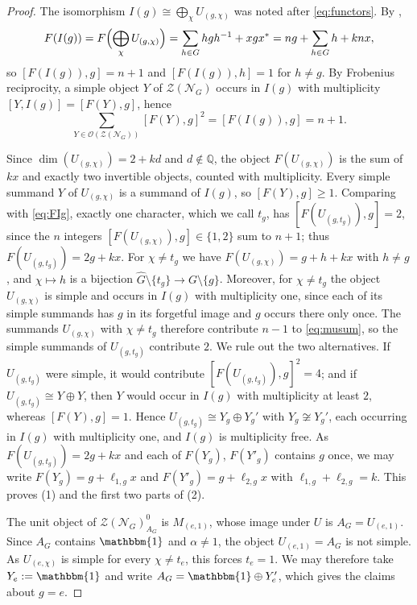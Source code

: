 \documentclass[10pt]{article}
\theoremstyle{plain}
\theoremstyle{definition}
\theoremstyle{plain}
\begin{document}
\begin{proof}
The isomorphism $I(g)\cong\bigoplus_\chi U_{(g,\chi)}$ was noted after \eqref{eq:functors}. By \cite[Proposition 5.4]{MR2183279},
\begin{equation}\label{eq:FIg}
F(I(g)) = F\Bigl(\bigoplus_\chi U_{(g,\chi)}\Bigr)=\sum_{h\in G}hgh^{-1}+xgx^\ast=ng+\sum_{h\in G}h+knx,
\end{equation}
so $[F(I(g)),g]=n+1$ and $[F(I(g)),h]=1$ for $h\neq g$. By Frobenius reciprocity, a simple object $Y$ of $\mathcal{Z}(\mathcal{N}_G)$ occurs in $I(g)$ with multiplicity $[Y,I(g)]=[F(Y),g]$, hence
\begin{equation}\label{eq:musum}
\sum_{Y \in \mathcal{O}(\mathcal{Z}(\mathcal{N}_G))}[F(Y),g]^2=[F(I(g)),g]=n+1.
\end{equation}

\par Since $\dim(U_{(g,\chi)})=2+kd$ and $d\notin\mathbb{Q}$, the object $F(U_{(g,\chi)})$ is the sum of $kx$ and exactly two invertible objects, counted with multiplicity. Every simple summand $Y$ of $U_{(g,\chi)}$ is a summand of $I(g)$, so $[F(Y),g]\geq1$. Comparing with \eqref{eq:FIg}, exactly one character, which we call $t_g$, has $[F(U_{(g,t_g)}),g]=2$, since the $n$ integers $[F(U_{(g,\chi)}),g]\in\{1,2\}$ sum to $n+1$; thus $F(U_{(g,t_g)})=2g+kx$. For $\chi\neq t_g$ we have $F(U_{(g,\chi)})=g+h+kx$ with $h\neq g$, and $\chi\mapsto h$ is a bijection $\widehat{G}\setminus\{t_g\}\to G\setminus\{g\}$. Moreover, for $\chi\neq t_g$ the object $U_{(g,\chi)}$ is simple and occurs in $I(g)$ with multiplicity one, since each of its simple summands has $g$ in its forgetful image and $g$ occurs there only once. The summands $U_{(g,\chi)}$ with $\chi\neq t_g$ therefore contribute $n-1$ to \eqref{eq:musum}, so the simple summands of $U_{(g,t_g)}$ contribute $2$. We rule out the two alternatives. If $U_{(g,t_g)}$ were simple, it would contribute $[F(U_{(g,t_g)}),g]^2=4$; and if $U_{(g,t_g)}\cong Y\oplus Y$, then $Y$ would occur in $I(g)$ with multiplicity at least $2$, whereas $[F(Y),g]=1$. Hence $U_{(g,t_g)}\cong Y_g\oplus Y_g'$ with $Y_g\not\cong Y_g'$, each occurring in $I(g)$ with multiplicity one, and $I(g)$ is multiplicity free. As $F(U_{(g,t_g)})=2g+kx$ and each of $F(Y_g)$, $F(Y'_g)$ contains $g$ once, we may write $F(Y_g)=g+\ell_{1,g}x$ and $F(Y'_g)=g+\ell_{2,g}x$ with $\ell_{1,g}+\ell_{2,g}=k$. This proves (1) and the first two parts of (2).

\par The unit object of $\mathcal{Z}(\mathcal{N}_G)_{A_G}^0$ is $M_{(e,1)}$, whose image under $U$ is $A_G=U_{(e,1)}$. Since $A_G$ contains $\mathbbm{1}$ and $\alpha\neq1$, the object $U_{(e,1)}=A_G$ is not simple. As $U_{(e,\chi)}$ is simple for every $\chi\neq t_e$, this forces $t_e=1$. We may therefore take $Y_e:=\mathbbm{1}$ and write $A_G=\mathbbm{1}\oplus Y'_e$, which gives the claims about $g=e$.


\end{proof}
\end{document}
